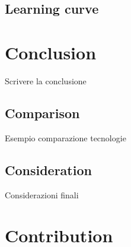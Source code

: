 \documentclass[12pt,a4paper,openright,twoside]{book}
\begin{document}
\section{Learning curve}







\chapter{Conclusion}
Scrivere la conclusione

\section{Comparison}
Esempio comparazione tecnologie

\section{Consideration}
Considerazioni finali



\chapter{Contribution}


%

\end{document}
